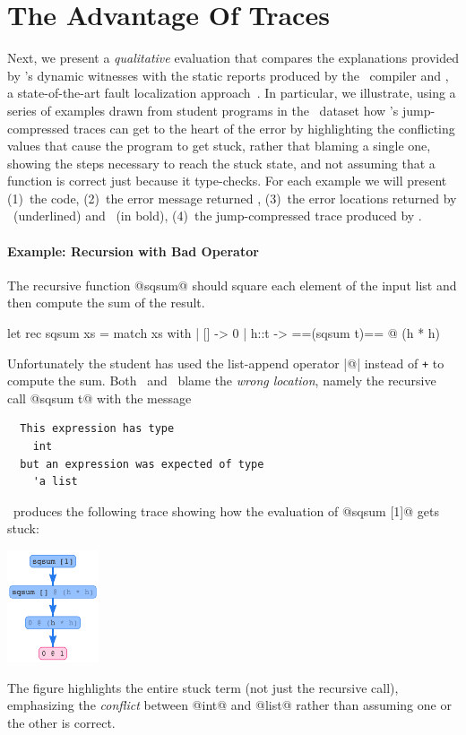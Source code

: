 \section{The Advantage Of Traces}\label{sec:advantage-traces}

Next, we present a \emph{qualitative} evaluation that compares
the explanations provided by \toolname's dynamic witnesses with
the static reports produced by the \ocaml\ compiler and \sherrloc,
a state-of-the-art fault localization approach~\cite{ZhangMyers}.
%
In particular, we illustrate, using a series of examples drawn
from student programs in the \ucsdbench\ dataset how \toolname's
jump-compressed traces can get to the heart of the error by
%
highlighting the conflicting values that cause the program to get
stuck, rather that blaming a single one,
%
showing the steps necessary to reach the stuck state, and
%
not assuming that a function is correct just because it type-checks.
%
For each example we will present
(1)~the code,
(2)~the error message returned \ocaml,
(3)~the error locations returned by \ocaml\ (underlined) and \sherrloc\ (in bold),
(4)~the jump-compressed trace produced by \toolname.



\paragraph{Example: Recursion with Bad Operator}
The recursive function @sqsum@ should square each
element of the input list and then compute the sum
of the result.
%
\begin{ecode}
  let rec sqsum xs = match xs with
    | [] -> 0
    | h::t -> ==(sqsum t)== @ (h * h)
\end{ecode}
%
Unfortunately the student has used the list-append
operator |@| instead of \texttt{+} to compute the sum.
%
Both \ocaml\ and \sherrloc\ blame the \emph{wrong location},
namely the recursive call @sqsum t@ with the message
%
\begin{verbatim}
  This expression has type
    int
  but an expression was expected of type
    'a list
\end{verbatim}
%
\toolname\ produces the following trace showing how the evaluation of
@sqsum [1]@ gets stuck:
%
\begin{center}
  \includegraphics[height=125px]{sqsum.png}
\end{center}
%
The figure highlights the entire stuck term
(not just the recursive call), emphasizing
the \emph{conflict} between @int@ and @list@
rather than assuming one or the other is correct.

